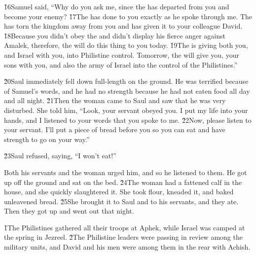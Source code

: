 \v{16}Samuel said, ``Why do you ask me, since the  has departed from you and become your enemy? \v{17}The  has done to you exactly as he spoke through me. The  has torn the kingdom away from you and has given it to your colleague David. \v{18}Because you didn't obey the  and didn't display his fierce anger against Amalek, therefore, the  will do this thing to you today. \v{19}The  is giving both you, and Israel with you, into Philistine control. Tomorrow, the  will give you, your sons with you, and also the army of Israel into the control of the Philistines.''

\v{20}Saul immediately fell down full-length on the ground. He was terrified because of Samuel's words, and he had no strength because he had not eaten food all day and all night. \v{21}Then the woman came to Saul and saw that he was very disturbed. She told him, ``Look, your servant obeyed you. I put my life into your hands, and I listened to your words that you spoke to me. \v{22}Now, please listen to your servant. I'll put a piece of bread before you so you can eat and have strength to go on your way.''

\v{23}Saul refused, saying, ``I won't eat!''

Both his servants and the woman urged him, and so he listened to them. He got up off the ground and sat on the bed. \v{24}The woman had a fattened calf in the house, and she quickly slaughtered it. She took flour, kneaded it, and baked unleavened bread. \v{25}She brought it to Saul and to his servants, and they ate. Then they got up and went out that night.

\v{1}The Philistines gathered all their troops at Aphek, while Israel was camped at the spring in Jezreel. \v{2}The Philistine leaders were passing in review among the military units, and David and his men were among them in the rear with Achish.

